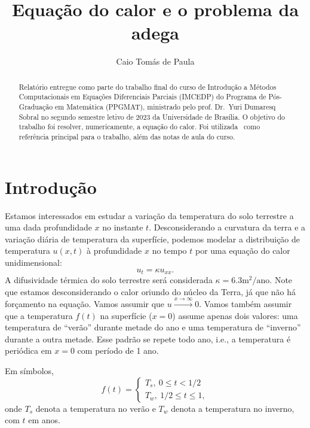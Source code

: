 \documentclass[twocolumn,showpacs,%
  nofootinbib,aps,superscriptaddress,%
  eqsecnum,prd,notitlepage,showkeys,10pt]{revtex4-1} %
\renewcommand{\leq}{\leqslant}
\begin{document}
\title{
  Equação do calor e o problema da adega
}
\author{Caio Tomás de Paula}
%
\begin{abstract}
    Relatório entregue como parte do trabalho final do curso de Introdução a
    Métodos Computacionais em Equações Diferenciais Parciais (IMCEDP) do
    Programa de Pós-Graduação em Matemática (PPGMAT),
    ministrado pelo prof. Dr.~Yuri Dumaresq Sobral no segundo semestre letivo
    de 2023 da Universidade de Brasília.
    O objetivo do trabalho foi resolver, numericamente, a equação do calor.
    Foi utilizada~\cite{lin1998} como referência principal para o trabalho, além
    das notas de aula do curso.
\end{abstract}
%
\maketitle
%
\section{Introdução}
%
	Estamos interessados em estudar a variação da temperatura do solo terrestre a uma dada
	profundidade $x$ no instante $t$. Desconsiderando a curvatura da terra e a variação diária
	de temperatura da superfície, podemos modelar a distribuição de temperatura $u(x,t)$ à
	profundidade $x$ no tempo $t$ por uma equação do calor unidimensional:
	\begin{equation*}
		u_t = \kappa u_{xx}.
	\end{equation*}
	A difusividade térmica do solo terrestre será considerada $\kappa = 6.3\text{m}^2/\text{ano}$.
	Note que estamos desconsiderando o calor oriundo do núcleo da Terra, já que não há forçamento
	na equação. Vamos assumir que $u \xrightarrow{x\to\infty} 0$. Vamos também assumir que
	a temperatura $f(t)$ na superfície ($x = 0$) assume apenas dois valores: uma temperatura
	de ``verão'' durante metade do ano e uma temperatura de ``inverno'' durante a outra metade.
	Esse padrão se repete todo ano, i.e., a temperatura é periódica em $x=0$ com período de 1 ano.

	Em símbolos,
	\begin{equation*}
		f(t) = \begin{cases}
			T_s, \ 0 \leq t < 1/2 \\
			T_w, \ 1/2 \leq t \leq 1,
		\end{cases}
	\end{equation*}
	onde $T_s$ denota a temperatura no verão e $T_w$ denota a temperatura no inverno, com $t$ em anos.
\end{document}
